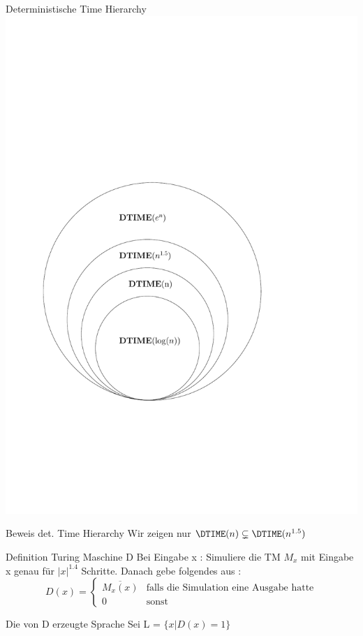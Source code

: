 \begin{frame}{Deterministische Time Hierarchy}
	\includegraphics[scale=0.5]{images/timehierarchy.pdf}
\end{frame}

\begin{frame}{Beweis det. Time Hierarchy}
	Wir zeigen nur $\DTIME(n) \subsetneq \DTIME(n^{1.5})$
	\bigskip
	\pause
	\begin{KITblock}{Definition Turing Maschine D} 
		Bei Eingabe x : Simuliere die TM $M_x$ mit Eingabe x genau für $|x|^{1.4}$ 						Schritte. Danach gebe folgendes aus :
		\begin{equation}
		D(x) = 
		\begin{cases}
			\overline{M_x(x)} & \text{falls die Simulation eine Ausgabe hatte} \\
			0 & \text{sonst}
			
		\end{cases}
		\end{equation}			
	\end{KITblock}
	\bigskip
	\pause	
	
	\begin{KITblock}{Die von D erzeugte Sprache}
		Sei L = $ \lbrace x \vert D(x) = 1  \rbrace$
	\end{KITblock}
\end{frame}


